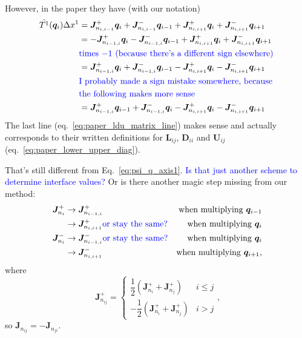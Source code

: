 \documentclass[12pt]{article}
\newcommand{\todo}[1]{\textcolor{blue}{#1}}
\begin{document}
However, in the paper they have (with our notation)
\begin{align}
    \tilde{T^1}(\bm{q}_i) \Delta x^1 &=
       \bm{J}^+_{n_{i,i-1}} \bm{q}_i + \bm{J}^-_{n_{i,i-1}} \bm{q}_{i-1} + 
       \bm{J}^+_{n_{i,i+1}} \bm{q}_i + \bm{J}^-_{n_{i,i+1}} \bm{q}_{i+1}
    \\ &=
       -\bm{J}^+_{n_{i-1,i}} \bm{q}_i - \bm{J}^-_{n_{i-1,i}} \bm{q}_{i-1} + 
       \bm{J}^+_{n_{i,i+1}} \bm{q}_i + \bm{J}^-_{n_{i,i+1}} \bm{q}_{i+1}
    \\ &\text{\todo{times $-1$ (because there's a different sign elsewhere)}} \notag
    \\ &=
       \bm{J}^+_{n_{i-1,i}} \bm{q}_i + \bm{J}^-_{n_{i-1,i}} \bm{q}_{i-1} - 
       \bm{J}^+_{n_{i,i+1}} \bm{q}_i - \bm{J}^-_{n_{i,i+1}} \bm{q}_{i+1}
    \\ &\text{\todo{I probably made a sign mistake somewhere, because }} \notag
    \\ &\text{\todo{the following makes more sense}} \notag
    \\ &=
       \bm{J}^+_{n_{i-1,i}} \bm{q}_{i-1} + \bm{J}^-_{n_{i-1,i}} \bm{q}_i - 
       \bm{J}^+_{n_{i,i+1}} \bm{q}_i - \bm{J}^-_{n_{i,i+1}} \bm{q}_{i+1}
       \label{eq:paper_ldu_matrix_line}
\end{align}
The last line (eq.~\ref{eq:paper_ldu_matrix_line}) makes sense and actually corresponds to their written definitions for
$\bm{L}_{ij}$, $\bm{D}_{ii}$ and $\bm{U}_{ij}$ (eq.~\ref{eq:paper_lower_upper_diag}).

That's still different from Eq.~\ref{eq:psi_q_axis1}. \todo{Is that just another scheme to determine interface values?}
Or is there another magic step missing from our method:
\begin{align}
    \bm{J}^+_{n_i}
        & \to \bm{J}^+_{n_{i-1,i}} & \text{when multiplying $\bm{q}_{i-1}$} \\
        & \to \bm{J}^+_{n_{i,i+1}} \text{\todo{or stay the same?}} & \text{when multiplying $\bm{q}_i$} \\
    \bm{J}^-_{n_i}
        & \to \bm{J}^-_{n_{i-1,i}} \text{\todo{or stay the same?}} & \text{when multiplying $\bm{q}_i$} \\
        & \to \bm{J}^-_{n_{i,i+1}} & \text{when multiplying $\bm{q}_{i+1}$}
        \text{,}
\end{align}
where
\begin{equation}
    \bm{J}_{n_{ij}}^+ = \left\{ \begin{matrix}
         \dfrac{1}{2}\left( \bm{J}_{n_i}^+ + \bm{J}_{n_j}^+ \right)  & i \le j \\
         -\dfrac{1}{2}\left( \bm{J}_{n_i}^+ + \bm{J}_{n_j}^+ \right) & i > j
    \end{matrix} \right.
    \text{,}
\end{equation}
so $\bm{J}_{n_{ij}} = -\bm{J}_{n_{ji}}$.
\end{document}
